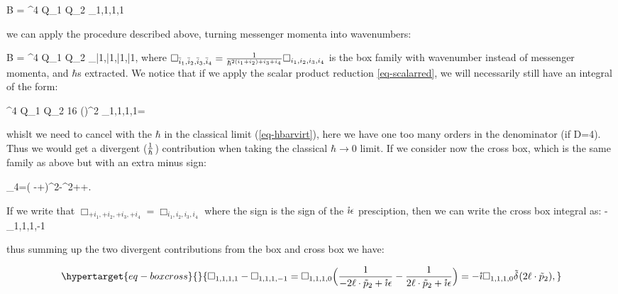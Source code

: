 \documentclass[
  10pt,
  a4paper,
  DIV=11,
  numbers=noendperiod,
  oneside]{scrreprt}
\let\[\relax \let\]\relax %
\DeclareRobustCommand{\[}{\begin{equation}}
\DeclareRobustCommand{\]}{\end{equation}}
\begin{document}
\[
\im B = \elch^4 Q_{1} Q_{2} \int \dn[D]{\ell} \Box_{1,1,1,1}
\]

we can apply the procedure described above, turning messenger momenta
into wavenumbers:

\[
\im B = \elch^4 Q_{1} Q_{2} \int \dn[D]{\bar{\ell}} \Box_{\bar{1},\bar{1},\bar{1},\bar{1}},
\] where
\(\Box_{\bar{i}_1,\bar{i}_2,\bar{i}_3,\bar{i}_4} =\frac{1}{\hbar^{2(i_1+i_2)+i_3+i_4}} \Box_{i_1,i_2,i_3,i_4}\)
is the box family with wavenumber instead of messenger momenta, and
\(\hbar\)s extracted. We notice that if we apply the scalar product
reduction \ref{eq-scalarred}, we will necessarily still have an integral
of the form:

\[
\elch^4 Q_{1} Q_{2} 16 (\semom[1]\cdot \semom[2])^2 \int \dn[D]{{\ell}}\Box_{1,1,1,1}=\order[D-6]{\hbar}
\]

whislt we need to cancel with the \(\hbar\) in the classical limit
(\ref{eq-hbarvirt}), here we have one too many orders in the denominator
(if D=4). Thus we would get a divergent (\(\frac{1}{\hbar}\)) contribution
when taking the classical \(\hbar\to 0\) limit. If we consider now the
cross box, which is the same family as above but with an extra minus
sign:

\[
\tilde{\rho}_4=( \Half[q] -\ell+\semom[2])^2-\mass[2]^2+\im \epsilon{}\ell\cdot\semom[2]+\im \epsilon.
\]

If we write that \(\Box_{+i_1,+i_2,+i_3,+i_4}=\Box_{i_1,i_2,i_3,i_4}\)
where the sign is the sign of the \(\mathring{\imath}\epsilon\) presciption, then we
can write the cross box integral as: \[
\int \dn[D]{\ell} -\Box_{1,1,1,-1}
\]

thus summing up the two divergent contributions from the box and cross
box we have:

\begin{equation}\protect\hypertarget{eq-boxcross}{}{
\Box_{1,1,1,1}-\Box_{1,1,1,-1}=\Box_{1,1,1,0}\pa[\Big]{\inv{-2\ell\cdot\semom[2]+\im \epsilon}-\inv{    2\ell\cdot\semom[2]+\im \epsilon}}=-\im\Box_{1,1,1,0}\ndeltafn{2\ell\cdot\semom[2]},
}\label{eq-boxcross}\end{equation}
\end{document}
